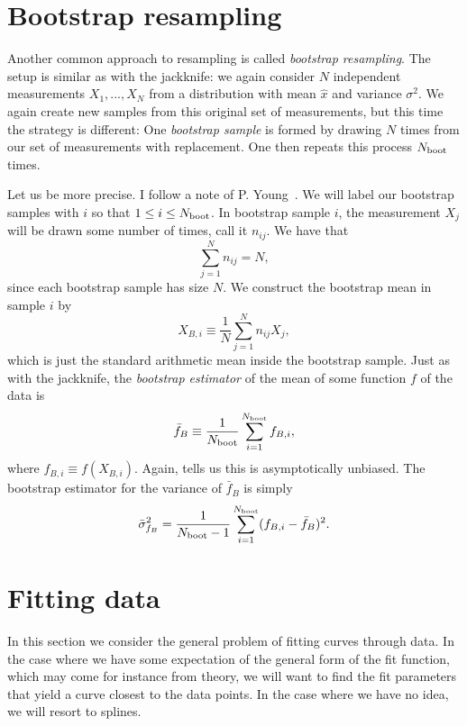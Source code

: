\section{Bootstrap resampling}

Another common approach to resampling is called {\it bootstrap resampling}.
The setup is similar as with the jackknife: we again consider
$N$ independent measurements $X_1,...,X_N$ from a distribution with mean
$\hat{x}$ and variance $\sigma^2$. We again create new samples from
this original set of measurements, but this time the strategy is different:
One {\it bootstrap sample} is formed by drawing $N$ times from our set
of measurements with replacement. One then repeats this process
$N_{\text{boot}}$ times.

Let us be more precise. I follow a note of P. Young~\cite{youngBootstrap}.
We will label our bootstrap samples with $i$ so that
$1\leq i\leq N_{\text{boot}}$. In bootstrap sample $i$, the measurement
$X_j$ will be drawn some number of times, call it $n_{ij}$.
We have that
\begin{equation}
\sum_{j=1}^Nn_{ij}=N,
\end{equation}
since each bootstrap sample has size $N$. We construct the bootstrap mean in
sample $i$ by
\begin{equation}
X_{B,i}\equiv\frac{1}{N}\sum_{j=1}^Nn_{ij}X_j,
\end{equation}
which is just the standard arithmetic mean inside the bootstrap sample.
Just as with the jackknife, the {\it bootstrap estimator} of the mean
of some function $f$ of the data is
\begin{equation}\label{eq:bootstrap}
  \bar{f}_B\equiv\frac{1}{N_{\text{boot}}}\sum_{i=1}^{N_{\text{boot}}} f_{B,i},
\end{equation}
where $f_{B,i}\equiv f(X_{B,i})$. 
Again,  tells us this is asymptotically unbiased.
The bootstrap estimator for the variance of $\bar{f}_B$ is simply
\begin{equation}\label{eq:bootvar}
  \bar\sigma^2_{f_B}=\frac{1}{N_{\text{boot}}-1}\sum_{i=1}^{N_{\text{boot}}}(f_{B,i}-\bar{f}_B)^2.
\end{equation}

\section{Fitting data}

In this section we consider the general problem of fitting curves through data.
In the case where we have some expectation of the general form of the fit
function, which may come for instance from theory, we will want to find the fit
parameters that yield a curve closest to the data points. In the case where we
have no idea, we will resort to splines.

